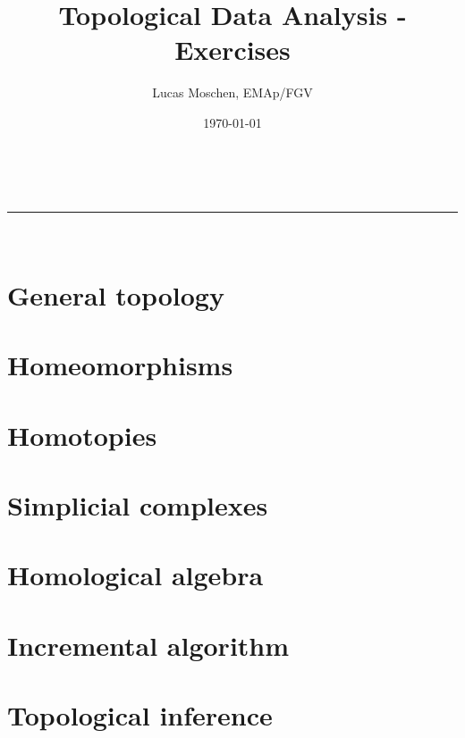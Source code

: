 \documentclass[a4paper,11pt]{article}
\title{Topological Data Analysis - Exercises}
\author{Lucas Moschen, EMAp/FGV}
\date{\today}
\makeatletter
\newcommand{\linia}{\rule{\linewidth}{0.5pt}}
\theoremstyle{mytheor}
\theoremstyle{mytheor}
\theoremstyle{remark}
\renewcommand{\maketitle}{
    \begin{center}
        \vspace{2ex}
        {\huge \textsc{\@title}}
        \vspace{1ex}
        \\
        \linia\\
        \@author \hfill \@date
        \vspace{4ex}
    \end{center}
}
\makeatother
\begin{document}
\maketitle

\tableofcontents

\section{General topology}



\newpage

\section{Homeomorphisms}



\newpage

\section{Homotopies}



\newpage

\section{Simplicial complexes}



\newpage

\section{Homological algebra}



\newpage

\section{Incremental algorithm}



\newpage

\section{Topological inference}
\end{document}
